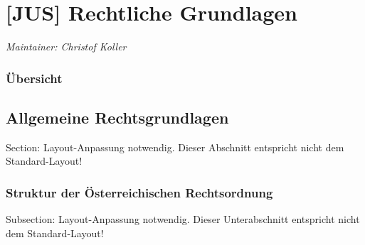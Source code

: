 \chapter{[JUS] Rechtliche Grundlagen}
\label{chp:JUS}

\emph{Maintainer: Christof Koller}


\setcounter{tocdepth}{10}
\subsection*{Übersicht}
\minitoc
{}



\section{Allgemeine Rechtsgrundlagen}
\begin{anfxwarning}[author=GABS]{Section: Layout-Anpassung notwendig.}
Dieser Abschnitt entspricht nicht dem Standard-Layout!
\end{anfxwarning}

\subsection{Struktur der \"Osterreichischen Rechtsordnung}
\begin{anfxwarning}[author=GABS]{Subsection: Layout-Anpassung notwendig.}
Dieser Unterabschnitt entspricht nicht dem Standard-Layout!
\end{anfxwarning}


